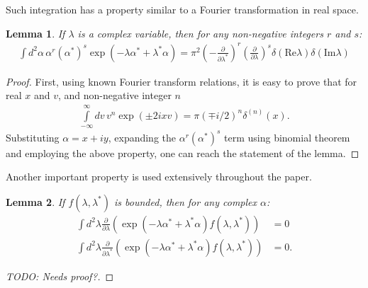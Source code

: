 \documentclass[12pt,aip,jmp,amssymb,amsmath]{revtex4-1}
\newtheorem{lemma}{Lemma}
\begin{document}
Such integration has a property similar to a Fourier transformation in real space.

\begin{lemma}
\label{lmm:c-numbers:fourier-of-moments}
    If $\lambda$ is a complex variable, then for any non-negative integers $r$ and $s$:
    \begin{equation*}\begin{split}
        \int d^2\alpha\, \alpha^r (\alpha^*)^s \exp(-\lambda \alpha^* + \lambda^* \alpha)
        = \pi^2
            \left( -\frac{\partial}{\partial \lambda^*} \right)^r
            \left( \frac{\partial}{\partial \lambda} \right)^s
            \delta(\mathrm{Re} \lambda) \delta(\mathrm{Im} \lambda)
    \end{split}\end{equation*}
\end{lemma}
\begin{proof}
First, using known Fourier transform relations, it is easy to prove that for real $x$ and $v$, and non-negative integer $n$
\begin{equation*}\begin{split}
    \int\limits_{-\infty}^{\infty} dv\, v^n \exp(\pm 2 i x v)
    = \pi (\mp i / 2)^n \delta^{(n)}(x).
\end{split}\end{equation*}
Substituting $\alpha = x + iy$, expanding the $\alpha^r (\alpha^*)^s$ term using binomial theorem and employing the above property, one can reach the statement of the lemma.
\end{proof}

Another important property is used extensively throughout the paper.

\begin{lemma}
\label{lmm:c-numbers:zero-integrals}
    If $f(\lambda, \lambda^*)$ is bounded, then for any complex $\alpha$:
    \begin{equation*}\begin{split}
        \int d^2\lambda
            \frac{\partial}{\partial \lambda} \left(
                \exp(-\lambda \alpha^* + \lambda^* \alpha)
                f(\lambda, \lambda^*)
            \right)
        & = 0 \\
        \int d^2\lambda
            \frac{\partial}{\partial \lambda^*}
            \left(
                \exp(-\lambda \alpha^* + \lambda^* \alpha)
                f(\lambda, \lambda^*)
            \right)
        & = 0.
    \end{split}\end{equation*}
\end{lemma}
\begin{proof}
[TODO: Needs proof?]
\end{proof}
\end{document}

